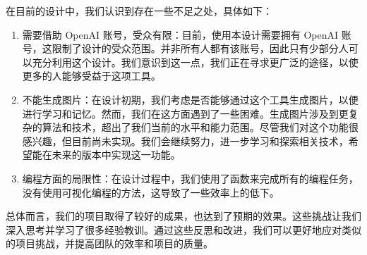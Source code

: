 \documentclass[12pt]{article}
\begin{document}
在目前的设计中，我们认识到存在一些不足之处，具体如下：

\begin{enumerate}
  \item 需要借助 OpenAI 账号，受众有限：目前，使用本设计需要拥有 OpenAI 账号，这限制了设计的受众范围。并非所有人都有该账号，因此只有少部分人可以充分利用这个设计。我们意识到这一点，我们正在寻求更广泛的途径，以使更多的人能够受益于这项工具。

  \item 不能生成图片：在设计初期，我们考虑是否能够通过这个工具生成图片，以便进行学习和记忆。然而，我们在这方面遇到了一些困难。生成图片涉及到更复杂的算法和技术，超出了我们当前的水平和能力范围。尽管我们对这个功能很感兴趣，但目前尚未实现。我们会继续努力，进一步学习和探索相关技术，希望能在未来的版本中实现这一功能。

  \item 编程方面的局限性：在设计过程中，我们使用了函数来完成所有的编程任务，没有使用可视化编程的方法，这导致了一些效率上的低下。
\end{enumerate}

总体而言，我们的项目取得了较好的成果，也达到了预期的效果。这些挑战让我们深入思考并学习了很多经验教训。通过这些反思和改进，我们可以更好地应对类似的项目挑战，并提高团队的效率和项目的质量。
\end{document}
